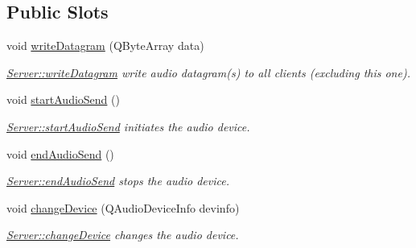 \subsection*{Public Slots}
\begin{DoxyCompactItemize}
\item 
void \hyperlink{class_server_a47ec2f74efe239057a33fa20183f8417}{write\+Datagram} (Q\+Byte\+Array data)
\begin{DoxyCompactList}\small\item\em \hyperlink{class_server_a47ec2f74efe239057a33fa20183f8417}{Server\+::write\+Datagram} write audio datagram(s) to all clients (excluding this one). \end{DoxyCompactList}\item 
\hypertarget{class_server_aa2bc8edebbe7c55cda13e35969d288d8}{void \hyperlink{class_server_aa2bc8edebbe7c55cda13e35969d288d8}{start\+Audio\+Send} ()}\label{class_server_aa2bc8edebbe7c55cda13e35969d288d8}

\begin{DoxyCompactList}\small\item\em \hyperlink{class_server_aa2bc8edebbe7c55cda13e35969d288d8}{Server\+::start\+Audio\+Send} initiates the audio device. \end{DoxyCompactList}\item 
\hypertarget{class_server_a894e78a064ebbf6c0a82520941fc587b}{void \hyperlink{class_server_a894e78a064ebbf6c0a82520941fc587b}{end\+Audio\+Send} ()}\label{class_server_a894e78a064ebbf6c0a82520941fc587b}

\begin{DoxyCompactList}\small\item\em \hyperlink{class_server_a894e78a064ebbf6c0a82520941fc587b}{Server\+::end\+Audio\+Send} stops the audio device. \end{DoxyCompactList}\item 
void \hyperlink{class_server_a6754ec9f0275c85ea2e21047d2800b06}{change\+Device} (Q\+Audio\+Device\+Info devinfo)
\begin{DoxyCompactList}\small\item\em \hyperlink{class_server_a6754ec9f0275c85ea2e21047d2800b06}{Server\+::change\+Device} changes the audio device. \end{DoxyCompactList}\end{DoxyCompactItemize}
